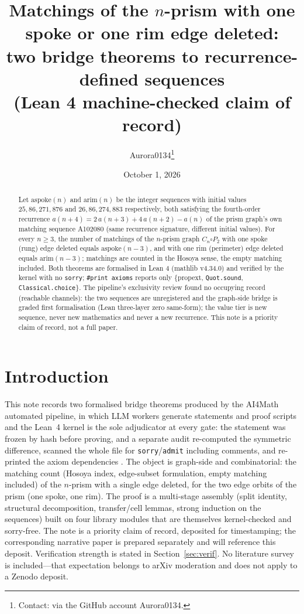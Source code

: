 \documentclass[11pt]{article}
\title{Matchings of the $n$-prism with one spoke or one rim edge deleted:\\
two bridge theorems to recurrence-defined sequences\\
{\large (Lean 4 machine-checked claim of record)}}
\author{Aurora0134\thanks{Contact: via the GitHub account Aurora0134.}}
\date{October 1, 2026}
\begin{document}
\maketitle

\begin{abstract}
Let $\mathrm{aspoke}(n)$ and $\mathrm{arim}(n)$ be the integer sequences with
initial values $25, 86, 271, 876$ and $26, 86, 274, 883$ respectively, both
satisfying the fourth-order recurrence
$a(n{+}4) = 2\,a(n{+}3) + 4\,a(n{+}2) - a(n)$ of the prism graph's own matching
sequence A102080 (same recurrence signature, different initial values). For
every $n \ge 3$, the number of matchings of the $n$-prism graph
$C_n \square P_2$ with one spoke (rung) edge deleted equals
$\mathrm{aspoke}(n-3)$, and with one rim (perimeter) edge deleted equals
$\mathrm{arim}(n-3)$; matchings are counted in the Hosoya sense, the empty
matching included. Both theorems are formalised in Lean 4 (mathlib
v4.34.0) and verified by the kernel with no \texttt{sorry}; \texttt{\#print
axioms} reports only \{propext, \texttt{Quot.sound},
\texttt{Classical.choice}\}. The pipeline's exclusivity review found no
occupying record (reachable channels): the two sequences are unregistered and
the graph-side bridge is graded first formalisation (Lean three-layer zero
same-form); the value tier is new sequence, never new mathematics and never a
new recurrence. This note is a priority claim of record, not a full paper.
\end{abstract}

\section{Introduction}
This note records two formalised bridge theorems produced by the AI4Math
automated pipeline, in which LLM workers generate statements and proof scripts
and the Lean~4 kernel is the sole adjudicator at every gate: the statement was
frozen by hash before proving, and a separate audit re-computed the symmetric
difference, scanned the whole file for \texttt{sorry}/\texttt{admit} including
comments, and re-printed the axiom dependencies \cite{lean4}. The object is
graph-side and combinatorial: the matching count (Hosoya index, edge-subset
formulation, empty matching included) of the $n$-prism with a single edge
deleted, for the two edge orbits of the prism (one spoke, one rim). The proof
is a multi-stage assembly (split identity, structural decomposition,
transfer/cell lemmas, strong induction on the sequences) built on four
library modules that are themselves kernel-checked and sorry-free. The note is
a priority claim of record, deposited for timestamping; the corresponding
narrative paper is prepared separately and will reference this deposit.
Verification strength is stated in Section~\ref{sec:verif}. No literature
survey is included---that expectation belongs to arXiv moderation and does not
apply to a Zenodo deposit.
\end{document}

